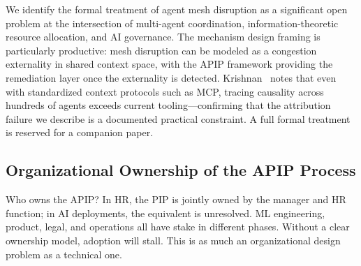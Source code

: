 We identify the formal treatment of agent mesh disruption as a significant open
problem at the intersection of multi-agent coordination, information-theoretic
resource allocation, and AI governance. The mechanism design framing is
particularly productive: mesh disruption can be modeled as a congestion
externality in shared context space, with the APIP framework providing the
remediation layer once the externality is detected.
Krishnan~\cite{krishnan2025mcp} notes that even with standardized context
protocols such as MCP, tracing causality across hundreds of agents exceeds
current tooling---confirming that the attribution failure we describe is a
documented practical constraint. A full formal treatment is reserved for a
companion paper.

\subsection{Organizational Ownership of the APIP Process}
\label{subsec:ownership}

Who owns the APIP? In HR, the PIP is jointly owned by the manager and HR
function; in AI deployments, the equivalent is unresolved. ML engineering,
product, legal, and operations all have stake in different phases. Without a
clear ownership model, adoption will stall. This is as much an organizational
design problem as a technical one.
